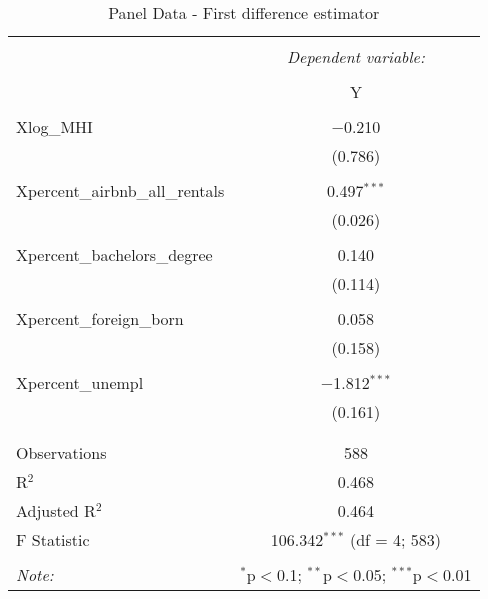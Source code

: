 \documentclass{article}
\begin{document}
\begin{table}[!htbp] \centering 
  \caption{ Panel Data - First difference estimator} 
  \label{} 
  \begin{tabular}{@{\extracolsep{5pt}}lc} 
    \\[-1.8ex]\hline 
    \hline \\[-1.8ex] 
    & \multicolumn{1}{c}{\textit{Dependent variable:}} \\ 
    \cline{2-2} 
    \\[-1.8ex] & Y \\ 
    \hline \\[-1.8ex] 
    Xlog\_MHI & $-$0.210 \\ 
    & (0.786) \\ 
    & \\ 
    Xpercent\_airbnb\_all\_rentals & 0.497$^{***}$ \\ 
    & (0.026) \\ 
    & \\ 
    Xpercent\_bachelors\_degree & 0.140 \\ 
    & (0.114) \\ 
    & \\ 
    Xpercent\_foreign\_born & 0.058 \\ 
    & (0.158) \\ 
    & \\ 
    Xpercent\_unempl & $-$1.812$^{***}$ \\ 
    & (0.161) \\ 
    & \\ 
    \hline \\[-1.8ex] 
    Observations & 588 \\ 
    R$^{2}$ & 0.468 \\ 
    Adjusted R$^{2}$ & 0.464 \\ 
    F Statistic & 106.342$^{***}$ (df = 4; 583) \\ 
    \hline 
    \hline \\[-1.8ex] 
    \textit{Note:}  & \multicolumn{1}{r}{$^{*}$p$<$0.1; $^{**}$p$<$0.05; $^{***}$p$<$0.01} \\ 
  \end{tabular} 
\end{table}
\end{document}
